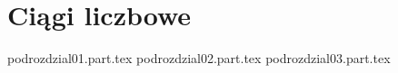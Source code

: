 \chapter{Ciągi liczbowe}


{podrozdzial01.part.tex}
{podrozdzial02.part.tex}
{podrozdzial03.part.tex}
